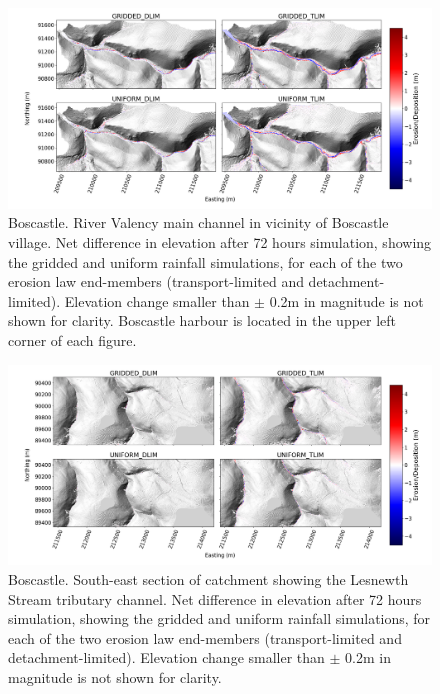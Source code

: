 
\begin{figure}
\includegraphics[width=25cm]{chp06_figures_scripts/figure_boscastle_erosion_diff_ensemble.png}
\caption{Boscastle. River Valency main channel in vicinity of Boscastle village. Net difference in elevation after 72 hours simulation, showing the gridded and uniform rainfall simulations, for each of the two erosion law end-members (transport-limited and detachment-limited). Elevation change smaller than \(\pm\) 0.2m in magnitude is not shown for clarity. Boscastle harbour is located in the upper left corner of each figure.}
\label{fig_boscastle_2dplan_erosion_ensemble}
\end{figure}

\begin{figure}
\includegraphics[width=25cm]{chp06_figures_scripts/figure_boscastle_erosion_diff_ensemble_SE.png}
\caption{Boscastle. South-east section of catchment showing the Lesnewth Stream tributary channel. Net difference in elevation after 72 hours simulation, showing the gridded and uniform rainfall simulations, for each of the two erosion law end-members (transport-limited and detachment-limited). Elevation change smaller than \(\pm\) 0.2m in magnitude is not shown for clarity. }
\label{fig_boscastle_2dplan_erosion_ensemble_SE}
\end{figure}

